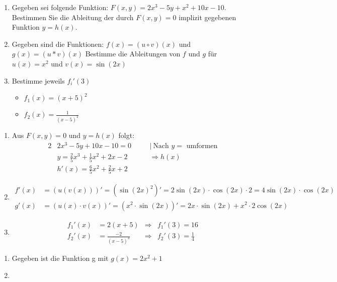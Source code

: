\begin{enumerate}
	\item Gegeben sei folgende Funktion: $F(x,y)=2x^3-5y+x^2+10x-10$. Bestimmen Sie die Ableitung der durch $F(x,y)=0$ implizit gegebenen Funktion $y=h(x)$.
	\item Gegeben sind die Funktionen:
	$f(x) = (u \circ v)(x)$ und $g(x) = (u* v)(x)$
	Bestimme die Ableitungen von $f$ und $g$ für $u(x)=x^2$ und $v(x)=\sin(2x)$
	\item Bestimme jeweils $f_i'(3)$
	\begin{itemize}
		\item $f_1(x) = (x+5)^2$
		\item $f_2(x) = \frac{1}{(x-5)^2}$
	\end{itemize}
\end{enumerate}
\begin{lsg}{}
	\begin{enumerate}
		\item Aus $F(x,y)=0$ und $y=h(x)$ folgt:\begin{alignat*}{2}
		&2x^3-5y+10x-10=0\quad&&|\ \text{Nach $y=$ umformen}\\
		&y=\frac{2}{5} x^3+\frac{1}{5} x^2+2x-2 &&\Rightarrow h(x)\\
		&h'(x)=\frac{6}{5} x^2+\frac{2}{5}x+2
		\end{alignat*}
		\item \begin{align*}
		f'(x)&=\left(u(v(x))\right)'=\left({\sin(2x)}^2\right)'=2\sin(2x)\cdot \cos(2x) \cdot 2=4\sin(2x)\cdot \cos(2x)\\
		g'(x)&=(u(x)\cdot v(x))'=\left(x^2\cdot \sin(2x)\right)'=2x\cdot \sin(2x)+x^2\cdot 2\cos(2x)
		\end{align*}
		\item \begin{align*}
		f_1'(x)&=2(x+5)&\Rightarrow  &f_1'(3)=16\\
		f_2'(x)&=\frac{-2}{(x-5)^3}&\Rightarrow &f_2'(3)=\frac{1}{4}
		\end{align*}
	\end{enumerate}
\end{lsg}
\cas
\begin{enumerate}
	\item Gegeben ist die Funktion g mit $g(x)=2x^2+1$
  \item
\end{enumerate}

